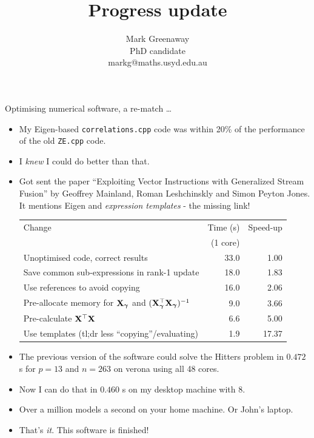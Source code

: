 \documentclass{beamer}
\title{Progress update}
\author{Mark Greenaway\\PhD candidate\\markg@maths.usyd.edu.au}
\begin{document}
\begin{frame}
\titlepage
\end{frame}

\begin{frame}{Optimising numerical software, a re-match \ldots}
\scriptsize
\begin{itemize}
\item My Eigen-based \texttt{correlations.cpp} code was within 20\% of the performance of the old
			\texttt{ZE.cpp} code.
\item I \emph{knew} I could do better than that.
\item Got sent the paper ``Exploiting Vector Instructions with Generalized Stream Fusion'' by Geoffrey 
			Mainland, Roman Leshchinskly and Simon Peyton Jones. It mentions Eigen and \emph{expression templates} -
			the missing link!
\begin{tabular}{|p{5cm}|rr|}
\hline
Change & Time (s) & Speed-up \\
& (1 core) & \\
\hline
Unoptimised code, correct results & 33.0 & 1.00\\
Save common sub-expressions in rank-1 update & 18.0 & 1.83 \\
Use references to avoid copying & 16.0 & 2.06 \\
Pre-allocate memory for ${\bf X}_{\boldsymbol \gamma}$ and $({\bf X}_{\boldsymbol \gamma}^\top {\bf X}_{\boldsymbol \gamma})^{-1}$ & 9.0 & 3.66 \\
Pre-calculate ${\bf X}^\top {\bf X}$ & 6.6 & 5.00 \\
Use templates (tl;dr less ``copying''/evaluating) & 1.9 & 17.37 \\
\hline
\end{tabular}
\item The previous version of the software could solve the Hitters problem in
$0.472$ s for $p=13$ and $n=263$ on verona using all 48 cores. 
\item Now I can do that in $0.460$ s on my desktop machine with 8.
\item Over a million models a second on your home machine. Or John's laptop.
\item That's \emph{it}. This software is finished!
\end{itemize}
\end{frame}
\end{document}
